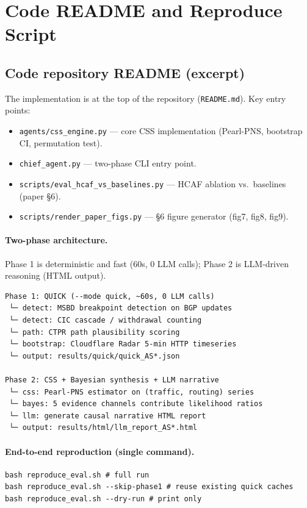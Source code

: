 \documentclass[sigcomm,nonatbib]{acmart}
\begin{document}
\section{Code README and Reproduce Script}
\label{sec:s4-code}

\subsection{Code repository README (excerpt)}

\noindent The implementation is at the top of the repository
(\texttt{README.md}). Key entry points:

\begin{itemize}
\item \texttt{agents/css\_engine.py} --- core CSS implementation
(Pearl-PNS, bootstrap CI, permutation test).
\item \texttt{chief\_agent.py} --- two-phase CLI entry point.
\item \texttt{scripts/eval\_hcaf\_vs\_baselines.py} --- HCAF
ablation vs.\ baselines (paper \S6).
\item \texttt{scripts/render\_paper\_figs.py} --- \S6 figure
generator (fig7, fig8, fig9).
\end{itemize}

\paragraph{Two-phase architecture.} Phase 1 is deterministic and fast
(60s, 0 LLM calls); Phase 2 is LLM-driven reasoning (HTML output).

\begin{verbatim}
Phase 1: QUICK (--mode quick, ~60s, 0 LLM calls)
 └─ detect: MSBD breakpoint detection on BGP updates
 └─ detect: CIC cascade / withdrawal counting
 └─ path: CTPR path plausibility scoring
 └─ bootstrap: Cloudflare Radar 5-min HTTP timeseries
 └─ output: results/quick/quick_AS*.json

Phase 2: CSS + Bayesian synthesis + LLM narrative
 └─ css: Pearl-PNS estimator on (traffic, routing) series
 └─ bayes: 5 evidence channels contribute likelihood ratios
 └─ llm: generate causal narrative HTML report
 └─ output: results/html/llm_report_AS*.html
\end{verbatim}

\paragraph{End-to-end reproduction (single command).}
\begin{verbatim}
bash reproduce_eval.sh # full run
bash reproduce_eval.sh --skip-phase1 # reuse existing quick caches
bash reproduce_eval.sh --dry-run # print only
\end{verbatim}
\end{document}
